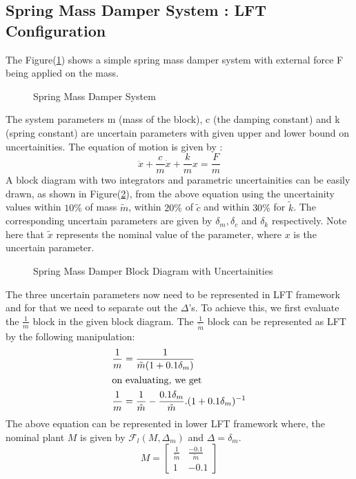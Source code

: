 \documentclass[a4paper,12pt]{article}
\begin{document}
			\subsection{Spring Mass Damper System : LFT Configuration} The Figure(\ref{smd}) shows a simple spring mass damper system with external force F being applied on the mass.
			\begin{figure}[H]
 
			  \centering
			  
			  
			  \caption{Spring Mass Damper System}
			 \label{smd}
		\end{figure} The system parameters m (mass of the block), c (the damping constant) and k (spring constant) are uncertain parameters with given upper and lower bound on uncertainities. The equation of motion is given by :
				\begin{equation}
					\ddot{x} + \frac{c}{m}\dot{x}+\frac{k}{m}x = \frac{F}{m}
				\end{equation}
				A block diagram with two integrators and parametric uncertainities can be easily drawn, as shown in Figure(\ref{smd2}), from the above equation using the uncertainity values within $10\%$ of mass $\tilde{m}$, within $20\%$ of $\tilde{c}$ and within $30\%$ for $\tilde{k}$. The corresponding uncertain parameters are given by $\delta_{m},\delta_{c}$ and $\delta_{k}$ respectively. Note here that $\tilde{x}$ represents the nominal value of the parameter, where $x$ is the uncertain parameter. 

			\begin{figure}[H]
 
			  \centering
			  
			  
			  \caption{Spring Mass Damper Block Diagram with Uncertainities}
			 \label{smd2}
		\end{figure}				
				The three uncertain parameters now need to be represented in LFT framework and for that we need to separate out the $\Delta$'s. To achieve this, we first evaluate the $\frac{1}{m}$ block in the given block diagram. The $\frac{1}{\tilde{m}}$ block can be represented as LFT by the following manipulation:
				\begin{align}
					\frac{1}{m} &= \frac{1}{\tilde{m}(1+0.1\delta_{m})}\\
					\intertext{on evaluating, we get}
					\frac{1}{m} &= \frac{1}{\tilde{m}} - \frac{0.1\delta_{m}}{\tilde{m}}. (1+0.1\delta_{m})^{-1}
				\end{align}
				The above equation can be represented in lower LFT framework where, the nominal plant $M$ is given by $\mathscr{F}_{l}(M,\Delta_{m})$ and $\Delta = \delta_{m}$.
				\[M=
				\begin{bmatrix}
					\frac{1}{\tilde{m}} & \frac{-0.1}{\tilde{m}} \\
					1 & -0.1
				\end{bmatrix}
				\]
				
\end{document}
